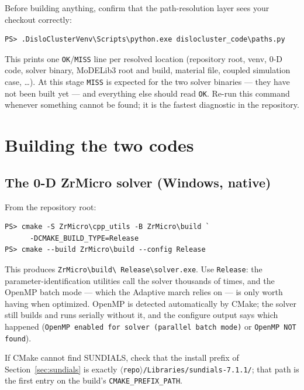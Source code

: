 \documentclass[11pt]{article}
\newcommand{\ZrM}{\textsf{ZrMicro}}
\newcommand{\MoD}{\textsf{MoDELib3}}
\newcommand{\code}[1]{\texttt{\small #1}}
\newcommand{\file}[1]{\texttt{\footnotesize #1}}
\begin{document}
Before building anything, confirm that the path-resolution layer sees your
checkout correctly:

\begin{lstlisting}[style=ps]
PS> .DisloClusterVenv\Scripts\python.exe dislocluster_code\paths.py
\end{lstlisting}

This prints one \code{OK}/\code{MISS} line per resolved location (repository
root, venv, 0-D code, solver binary, \MoD{} root and build, material file,
coupled simulation case, \dots). At this stage \code{MISS} is expected for
the two solver binaries --- they have not been built yet --- and everything
else should read \code{OK}. Re-run this command whenever something cannot be
found; it is the fastest diagnostic in the repository.

\section{Building the two codes}
\label{sec:build}

\subsection{The 0-D \ZrM{} solver (Windows, native)}
\label{sec:buildzrm}

From the repository root:

\begin{lstlisting}[style=ps]
PS> cmake -S ZrMicro\cpp_utils -B ZrMicro\build `
      -DCMAKE_BUILD_TYPE=Release
PS> cmake --build ZrMicro\build --config Release
\end{lstlisting}

This produces \file{ZrMicro\textbackslash build\textbackslash
Release\textbackslash solver.exe}. Use \code{Release}:
the parameter-identification utilities call the solver thousands of times,
and the OpenMP batch mode --- which the Adaptive march relies on --- is only
worth having when optimized. OpenMP is detected automatically by CMake; the
solver still builds and runs serially without it, and the configure output
says which happened
(\code{OpenMP enabled for solver (parallel batch mode)} or
\code{OpenMP NOT found}).

If CMake cannot find SUNDIALS, check that the install prefix of
Section~\ref{sec:sundials} is exactly
\file{$\langle$repo$\rangle$/Libraries/sundials-7.1.1/}; that path is the
first entry on the build's \code{CMAKE\_PREFIX\_PATH}.
\end{document}
